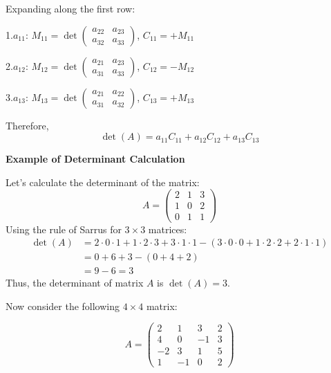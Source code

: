 Expanding along the first row:

1.\(a_{11}\):  \(M_{11} = \det \begin{pmatrix} a_{22} & a_{23} \\ a_{32} & a_{33} \end{pmatrix}\),  \(C_{11} = +M_{11}\)

2.\(a_{12}\):  \(M_{12} = \det \begin{pmatrix} a_{21} & a_{23} \\ a_{31} & a_{33} \end{pmatrix}\),  \(C_{12} = -M_{12}\)

3.\(a_{13}\):  \(M_{13} = \det \begin{pmatrix} a_{21} & a_{22} \\ a_{31} & a_{32} \end{pmatrix}\),  \(C_{13} = +M_{13}\)

Therefore,
\[
\det(A) = a_{11}C_{11} + a_{12}C_{12} + a_{13}C_{13}
\]


\textbf{Example of Determinant Calculation}

Let's calculate the determinant of the matrix:
\begin{equation*}
A =
\begin{pmatrix}
2 & 1 & 3 \\
1 & 0 & 2 \\
0 & 1 & 1
\end{pmatrix}
\end{equation*}
Using the rule of Sarrus for \(3 \times 3\) matrices:
\begin{align*}
\det(A) &= 2 \cdot 0 \cdot 1 + 1 \cdot 2 \cdot 3 + 3 \cdot 1 \cdot 1 - (3 \cdot 0 \cdot 0 + 1 \cdot 2 \cdot 2 + 2 \cdot 1 \cdot 1) \\
&= 0 + 6 + 3 - (0 + 4 + 2) \\
&= 9 - 6 = 3
\end{align*}
 Thus, the determinant of matrix \(A\) is \(\det(A) = 3\).

 Now consider the following \(4 \times 4\) matrix:

\begin{equation*}
A = 
\begin{pmatrix}
2 & 1 & 3 & 2 \\
4 & 0 & -1 & 3 \\
-2 & 3 & 1 & 5 \\
1 & -1 & 0 & 2
\end{pmatrix}
\end{equation*}

